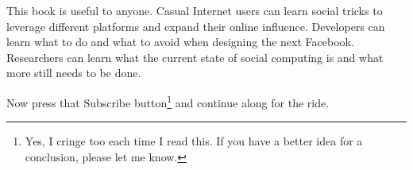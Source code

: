 \documentclass[class=book, crop=false]{standalone}
\begin{document}
This book is useful to anyone. Casual Internet users can learn social tricks to leverage different platforms and expand their online influence. Developers can learn what to do and what to avoid when designing the next Facebook. Researchers can learn what the current state of social computing is and what more still needs to be done.

Now press that Subscribe button\footnote{Yes, I cringe too each time I read this. If you have a better idea for a conclusion, please let me know.} and continue along for the ride.
\end{document}
